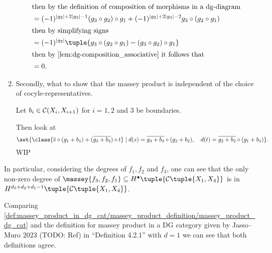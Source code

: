 \begin{remark}
\begin{enumerate}
{\begin{align*}
                \intertext{then by the definition of composition of morphisms in a dg-diagram}
                &= (-1)^{|g_2| + 2|g_3| - 1}(g_3 \circ g_2) \circ g_1 + (-1)^{|g_2| + 2|g_3| - 2}g_3 \circ (g_2 \circ g_1) \\
                \intertext{then by simplifying signs}
                &= (-1)^{|g_2|}\tuple{ g_3 \circ (g_2 \circ g_1) - (g_3 \circ g_2) \circ g_1 } \\
                \intertext{then by \autoref{lem:dg-composition_associative} it follows that}
                &= 0.
            \end{align*}
        }
        \item {
            Secondly, what to show that the massey product is independent of the choice of cocyle-representatives.

            Let \( b_i \in {\mathcal{C}}(X_i, X_{i + 1}) \) for \( i = 1, 2 \) and \( 3 \) be boundaries.

            Then look at
            \[
                \set{ \class{ \overline{s} \circ (g_1 + b_1) + (\overline{g_3 + b_3}) \circ t } \mid d(s) = \overline{g_3 + b_3} \circ (g_2 + b_2), \quad d(t) = \overline{g_2 + b_2} \circ (g_1 + b_1) }.
            \]
            WIP

        }
    \end{enumerate}
\end{remark}

\begin{remark}
    \label{rem:massey_product_in_dg_cat/massey_product_definition/massey_product_sum_of_degrees}
    In particular, considering the degrees of \( f_1, f_2 \) and \( f_3 \), one can see that the only non-zero degree of \( \massey{f_3, f_2, f_1 } \subseteq H^\bullet \tuple{\Cc \tuple{X_1, X_4}} \) is in \( H^{d_3 + d_2 + d_1 - 1} \tuple{\Cc \tuple{X_1, X_4}} \).
\end{remark}

\begin{remark}
    Comparing \autoref{def:massey_product_in_dg_cat/massey_product_definition/massey_product_dg_cat} and the definition for massey product in a DG category given by Jasso--Muro 2023 (TODO: Ref) in ``Definition 4.2.1'' with \( d = 1 \) we can see that both definitions agree.
\end{remark}

